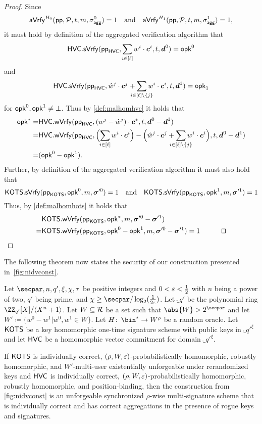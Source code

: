 \begin{proof}
    Since 
    \[
    \mathsf{aVrfy}^{H_0}(\mathsf{pp},\mathcal{P},t,m,\sigma_\mathsf{agg}^0)=1 \quad \text{and} \quad \mathsf{aVrfy}^{H_1}(\mathsf{pp},\mathcal{P},t,m,\sigma_\mathsf{agg}^1)=1,
    \]
    it must hold by definition of the aggregated verification algorithm that 
    \[
      \hvc.\sverify(\hvcparams,\smashoperator{\sum_{i\in[\ell]}} w^i\cdot \vec{c}^i,t,\vec{d}^0) = \opk^0 
    \]
    and
    \[   
      \hvc.\sverify(\hvcparams,\hat{w}^j\cdot \vec{c}^j+\smashoperator{\sum_{i\in[\ell]\setminus\{j\}}} w^i\cdot \vec{c}^i,t,\vec{d}^1)= \opk_1
    \]
    for $\mathsf{opk}^0,\mathsf{opk}^1\neq\bot$.
    Thus by \autoref{def:malhomhvc} it holds that
    \begin{align*}
      \opk^* =& \hvc.\wverify(\hvcparams,(w^j-\hat{w}^j)\cdot \vec{c}^*,t,\vec{d}^0-\vec{d}^1)\\
      =&\hvc.\wverify(\hvcparams,\Bigl(\smashoperator{\sum_{i\in[\ell]}} w^i\cdot \vec{c}^i\Bigr) - \Bigl(\hat{w}^j\cdot \vec{c}^j+\smashoperator{\sum_{i\in[\ell]\setminus\{j\}}} w^i\cdot \vec{c}^i\Bigr),t,\vec{d}^0-\vec{d}^1)\\
       =& (\opk^0-\opk^1).
    \end{align*}
    Further, by definition of the aggregated verification algorithm it must also hold that
    \[
      \mathsf{KOTS}.\mathsf{sVrfy}(\mathsf{pp}_{\mathsf{KOTS}},\mathsf{opk}^0,m,\boldsymbol{\sigma}'^0) =1 \quad \text{and} \quad \mathsf{KOTS}.\mathsf{sVrfy}(\mathsf{pp}_{\mathsf{KOTS}},\mathsf{opk}^1,m,\boldsymbol{\sigma}'^1)=1
    \]
    Thus, by \autoref{def:malhomhots} it holds that
    \begin{align*}
      &\hots.\wverify(\hotsparams,\opk^*,m,\otsig^0-\otsig^1)\\
      =&\hots.\wverify(\hotsparams,\opk^0-\opk^1,m,\otsig^0-\otsig^1)=1 \tag*{\qed}
    \end{align*}
\end{proof}
\fi
The following theorem now states the security of our construction presented in~\autoref{fig:nidvconst}.
\begin{theorem}\label{thm:mainconstruction}
Let $\secpar,n,q',\xi,\chi,\tau$ be positive integers and $0<\varepsilon < \tfrac{1}{2}$ with $n$ being a power of two, $q'$ being prime, and $\chi \geq \secpar/\log_2(\frac{1}{2\errorbound})$.
Let $\ring_{q'}$ be the polynomial ring $\defringqq$.
Let $W \subseteq \mathcal{R}$ be a set such that $\abs{W} > 2^\secpar$ and let $W' \coloneqq \{w^0-w^1| w^0,w^1 \in W\}$.
Let $H \colon\, \bin^* \to W^\rho$ be a random oracle.
Let $\mathsf{KOTS}$ be a key homomorphic one-time signature scheme with public keys in $\ring_{q'}^\xi$ and let $\mathsf{HVC}$ be a homomorphic vector commitment for domain $\ring_{q'}^\xi$.

If $\mathsf{KOTS}$ is individually correct, $(\rho,W,\varepsilon)$-probabilistically homomorphic, robustly homomorphic, and $W'$-multi-user existentially unforgeable under rerandomized keys and $\mathsf{HVC}$ is individually correct, $(\rho,W,\varepsilon)$-probabilistically homomorphic, robustly homomorphic, and position-binding, then the construction from \autoref{fig:nidvconst} is an unforgeable synchronized $\rho$-wise multi-signature scheme that is individually correct and has correct aggregations in the presence of rogue keys and signatures.
\end{theorem}


